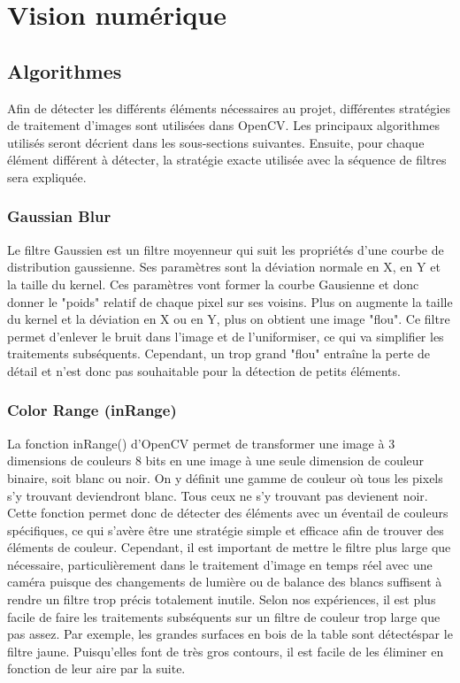 \chapter{Vision numérique}

\section{Algorithmes}

Afin de détecter les différents éléments nécessaires au projet, différentes stratégies de traitement d'images sont utilisées dans OpenCV. Les principaux algorithmes utilisés seront décrient dans les sous-sections suivantes. Ensuite, pour chaque élément différent à détecter, la stratégie exacte utilisée avec la séquence de filtres sera expliquée.

\subsection{Gaussian Blur}

Le filtre Gaussien est un filtre moyenneur qui suit les propriétés d'une courbe de distribution gaussienne. Ses paramètres sont la déviation normale en X, en Y et la taille du kernel. Ces paramètres vont former la courbe Gausienne et donc donner le "poids" relatif de chaque pixel sur ses voisins. Plus on augmente la taille du kernel et la déviation en X ou en Y, plus on obtient une image "flou". Ce filtre permet d'enlever le bruit dans l'image et de l'uniformiser, ce qui va simplifier les traitements subséquents. Cependant, un trop grand "flou" entraîne la perte de détail et n'est donc pas souhaitable pour la détection de petits éléments.

\subsection{Color Range (inRange)}

La fonction inRange() d'OpenCV permet de transformer une image à 3 dimensions de couleurs 8 bits en une image à une seule dimension de couleur binaire, soit blanc ou noir. On y définit une gamme de couleur où tous les pixels s'y trouvant deviendront blanc. Tous ceux ne s'y trouvant pas devienent noir. Cette fonction permet donc de détecter des éléments avec un éventail de couleurs spécifiques, ce qui s'avère être une stratégie simple et efficace afin de trouver des éléments de couleur. Cependant, il est important de mettre le filtre plus large que nécessaire, particulièrement dans le traitement d'image en temps réel avec une caméra puisque des changements de lumière ou de balance des blancs suffisent à rendre un filtre trop précis totalement inutile. Selon nos expériences, il est plus facile de faire les traitements subséquents sur un filtre de couleur trop large que pas assez. Par exemple, les grandes surfaces en bois de la table sont détectéspar le filtre jaune. Puisqu'elles font de très gros contours, il est facile de les éliminer en fonction de leur aire par la suite.


